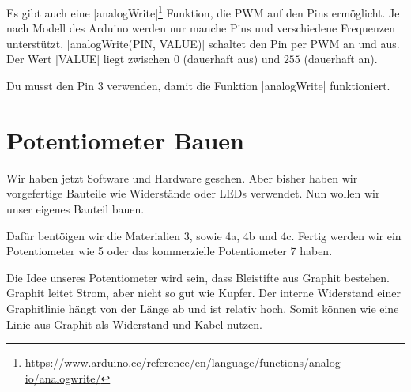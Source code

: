 \documentclass[a4paper,12pt]{book}
\begin{document}
Es gibt auch eine |analogWrite|\footnote{\url{https://www.arduino.cc/reference/en/language/functions/analog-io/analogwrite/}} Funktion, die PWM auf den Pins ermöglicht.
Je nach Modell des Arduino werden nur manche Pins und verschiedene Frequenzen unterstützt.
|analogWrite(PIN, VALUE)| schaltet den Pin per PWM an und aus.
Der Wert |VALUE| liegt zwischen $0$ (dauerhaft aus) und $255$ (dauerhaft an).

Du musst den Pin 3 verwenden, damit die Funktion |analogWrite| funktioniert.

\section*{Potentiometer Bauen}

Wir haben jetzt Software und Hardware gesehen. 
Aber bisher haben wir vorgefertige Bauteile wie Widerstände oder LEDs verwendet.
Nun wollen wir unser eigenes Bauteil bauen.

Dafür bentöigen wir die Materialien 3, sowie 4a, 4b und 4c.
Fertig werden wir ein Potentiometer wie 5 oder das kommerzielle Potentiometer 7 haben.

Die Idee unseres Potentiometer wird sein, dass Bleistifte aus Graphit bestehen.
Graphit leitet Strom, aber nicht so gut wie Kupfer.
Der interne Widerstand einer Graphitlinie hängt von der Länge ab und ist relativ hoch.
Somit können wie eine Linie aus Graphit als Widerstand und Kabel nutzen.

\end{document}
